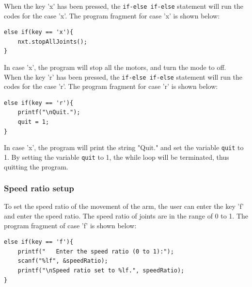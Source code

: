 \documentclass[11pt]{article}
\begin{document}
When the key 'x' has been pressed, the \verb+if-else if-else+ statement will run the codes for the case 'x'.
The program fragment for case 'x' is shown below:
\begin{verbatim} 
else if(key == 'x'){
    nxt.stopAllJoints();
}
\end{verbatim}
In case 'x', the program will stop all the motors, and turn the mode to off.\\

When the key 'r' has been pressed, the \verb+if-else if-else+ statement will run the codes for the case 'r'.
The program fragment for case 'r' is shown below:
\begin{verbatim} 
else if(key == 'r'){
    printf("\nQuit.");
    quit = 1;
}
\end{verbatim}
In case 'x', the program will print the string "Quit." and set the variable \verb+quit+ to 1.
By setting the variable \verb+quit+ to 1, the while loop will be terminated, thus quitting the program.

\subsubsection*{Speed ratio setup}
To set the speed ratio of the movement of the arm, the user can enter the key 'f' and enter the speed ratio.
The speed ratio of joints are in the range of 0 to 1. The program fragment of case 'f' is shown below:
\begin{verbatim}
else if(key == 'f'){
    printf("   Enter the speed ratio (0 to 1):");
    scanf("%lf", &speedRatio);
    printf("\nSpeed ratio set to %lf.", speedRatio);
}
\end{verbatim}
\end{document}
